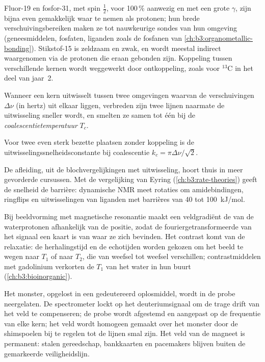 Fluor-19 en fosfor-31, met spin $\frac12$, voor 100\,\% aanwezig en met een
grote
$\gamma$, zijn bijna even gemakkelijk waar te nemen als protonen; hun
brede verschuivingsbereiken maken ze tot nauwkeurige sondes van hun
omgeving (geneesmiddelen, fosfaten, liganden zoals de fosfanen van
\cref{ch:b3:organometallic-bonding}). Stikstof-15 is zeldzaam en zwak, en
wordt meestal indirect waargenomen via de protonen die eraan gebonden
zijn. Koppeling tussen verschillende kernen wordt weggewerkt door
ontkoppeling, zoals voor ${}^{13}$C in
het deel van jaar~2.

\begin{definition}[Coalescentietemperatuur]\label{def:b3:advanced-nmr:coalescence}
Wanneer een kern uitwisselt tussen twee omgevingen waarvan de
verschuivingen $\Delta\nu$ (in hertz) uit elkaar liggen, verbreden zijn
twee lijnen naarmate de uitwisseling sneller wordt, en smelten ze samen
tot één bij de \emph{coalescentietemperatuur}
$T_c$.
\end{definition}

\begin{proposition}\label{prop:b3:advanced-nmr:coalescence}
Voor twee even sterk bezette plaatsen zonder koppeling is de
uitwisselingssnelheidsconstante bij coalescentie $k_c = \pi\Delta\nu/\sqrt2$.
\end{proposition}
\admitted

De afleiding, uit de blochvergelijkingen met uitwisseling, hoort thuis in
meer gevorderde cursussen. Met de vergelijking van Eyring
(\cref{ch:b3:rate-theories}) geeft de snelheid de barrière: dynamische
NMR meet rotaties om amidebindingen, ringflips en uitwisselingen van
liganden met barrières van 40 tot \qty{100}{kJ/mol}.

\begin{example}\label{ex:b3:advanced-nmr:mri}
Bij beeldvorming met magnetische resonantie maakt een veldgradiënt de
 van de waterprotonen afhankelijk van de positie, zodat de
fouriergetransformeerde van het signaal een kaart is van waar ze zich
bevinden. Het contrast komt van de relaxatie: de herhalingstijd en de
echotijden worden gekozen om het beeld te wegen naar $T_1$ of naar
$T_2$, die van weefsel tot weefsel verschillen; contrastmiddelen met
gadolinium verkorten de $T_1$ van het water in hun buurt
(\cref{ch:b3:bioinorganic}).
\end{example}

\begin{inthelab}
Het monster, opgelost in een gedeutereerd oplosmiddel, wordt in de probe
neergelaten. De spectrometer lockt op het deuteriumsignaal om de trage
drift van het veld te compenseren; de probe wordt afgestemd en aangepast
op de frequentie van elke kern; het veld wordt homogeen gemaakt over het
monster door de shimspoelen bij te regelen tot de lijnen smal zijn. Het
veld van de magneet is permanent: stalen gereedschap, bankkaarten en
pacemakers blijven buiten de gemarkeerde veiligheidslijn.
\end{inthelab}


